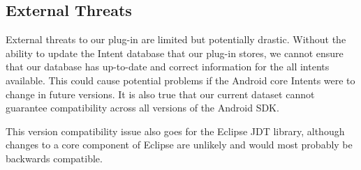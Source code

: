 \subsection{External Threats}

External threats to our plug-in are limited but potentially drastic. Without the ability to update the Intent database that our plug-in stores, we cannot ensure that our database has up-to-date and correct information for the all intents available. This could cause potential problems if the Android core Intents were to change in future versions. It is also true that our current dataset cannot guarantee compatibility across all versions of the Android SDK.

This version compatibility issue also goes for the Eclipse JDT library, although changes to a core component of Eclipse are unlikely and would most probably be backwards compatible.